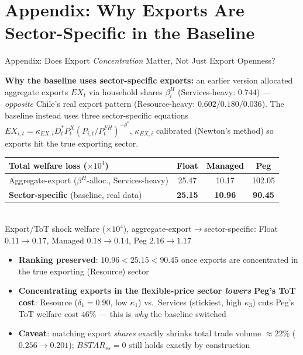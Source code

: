 \section*{Appendix: Why Exports Are Sector-Specific in the Baseline}
\begin{frame}{Appendix: Does Export \emph{Concentration} Matter, Not Just Export Openness?}

{\footnotesize \textbf{Why the baseline uses sector-specific exports:} an earlier version allocated aggregate exports $EX_t$ via household shares $\beta_i^H$ (Services-heavy: $0.744$) --- \emph{opposite} Chile's real export pattern (Resource-heavy: $0.602/0.180/0.036$). The baseline instead uses three sector-specific equations $EX_{i,t}=\kappa_{EX,i}D^*_t P_t^X(P_{i,t}/P_t^{FH})^{-\theta^*}$, $\kappa_{EX,i}$ calibrated (Newton's method) so exports hit the true exporting sector.}

\vspace{4pt}
\begin{center}
{\scriptsize
\begin{tabular}{lccc}
\toprule
\textbf{Total welfare loss ($\times10^4$)} & \textbf{Float} & \textbf{Managed} & \textbf{Peg} \\
\midrule
Aggregate-export ($\beta^H$-alloc., Services-heavy) & 25.47 & 10.17 & 102.05 \\
\textbf{Sector-specific} (baseline, real data) & \textbf{25.15} & \textbf{10.96} & \textbf{90.45} \\
\bottomrule
\end{tabular}\\[3pt]
{\tiny Export/ToT shock welfare ($\times10^4$), aggregate-export$\to$sector-specific: Float $0.11\to0.17$, Managed $0.18\to0.14$, Peg $2.16\to1.17$}}
\end{center}

\vspace{3pt}
{\footnotesize
\begin{itemize}\setlength{\itemsep}{2pt}
\item \textbf{Ranking preserved}: $10.96<25.15<90.45$ once exports are concentrated in the true exporting (Resource) sector
\item \textbf{Concentrating exports in the flexible-price sector \emph{lowers} Peg's ToT cost}: Resource ($\delta_1=0.90$, low $\kappa_1$) vs.\ Services (stickiest, high $\kappa_3$) cuts Peg's ToT welfare cost $46\%$ --- this is \emph{why} the baseline switched
\item \textbf{Caveat}: matching export \emph{shares} exactly shrinks total trade volume $\approx22\%$ ($0.256\to0.201$); $BSTAR_{ss}=0$ still holds exactly by construction
\end{itemize}}

\end{frame}

